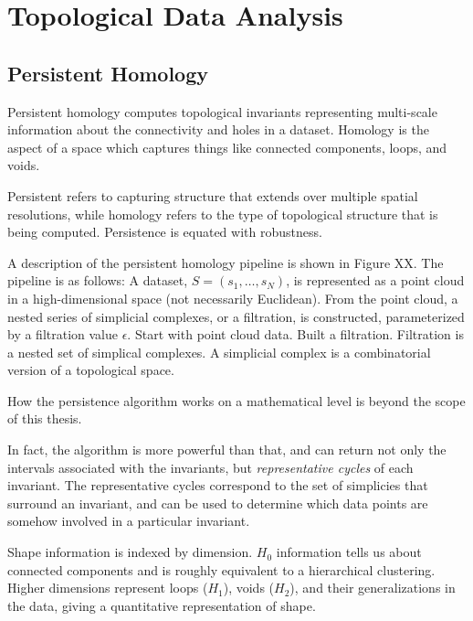 

\section{Topological Data Analysis}

\subsection{Persistent Homology}

Persistent homology computes topological invariants representing multi-scale information about the connectivity and holes in a dataset.
Homology is the aspect of a space which captures things like connected components, loops, and voids.

Persistent refers to capturing structure that extends over multiple spatial resolutions, while homology refers to the type of topological structure that is being computed.
Persistence is equated with robustness.

A description of the persistent homology pipeline is shown in Figure XX.
The pipeline is as follows:
A dataset, $S=(s_{1},\ldots,s_{N})$, is represented as a point cloud in a high-dimensional space (not necessarily Euclidean).
From the point cloud, a nested series of simplicial complexes, or a filtration, is constructed, parameterized by a filtration value $\epsilon$.
Start with point cloud data.
Built a filtration.
Filtration is a nested set of simplical complexes.
A simplicial complex is a combinatorial version of a topological space.

How the persistence algorithm works on a mathematical level is beyond the scope of this thesis.

In fact, the algorithm is more powerful than that, and can return not only the intervals associated with the invariants, but \emph{representative cycles} of each invariant.
The representative cycles correspond to the set of simplicies that surround an invariant, and can be used to determine which data points are somehow involved in a particular invariant.

Shape information is indexed by dimension. $H_0$ information tells us about connected components and is roughly equivalent to a hierarchical clustering.
Higher dimensions represent loops ($H_1$), voids ($H_2$), and their generalizations in the data, giving a quantitative representation of shape.

